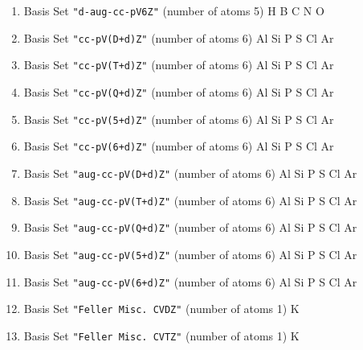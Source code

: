 \begin{enumerate}
\item Basis Set \verb#"d-aug-cc-pV6Z"# (number of atoms 5)  \newline
  H B C N O


\item Basis Set \verb#"cc-pV(D+d)Z"# (number of atoms 6)  \newline
  Al Si P S Cl Ar


\item Basis Set \verb#"cc-pV(T+d)Z"# (number of atoms 6)  \newline
  Al Si P S Cl Ar


\item Basis Set \verb#"cc-pV(Q+d)Z"# (number of atoms 6)  \newline
  Al Si P S Cl Ar

\item Basis Set \verb#"cc-pV(5+d)Z"# (number of atoms 6)  \newline
  Al Si P S Cl Ar


\item Basis Set \verb#"cc-pV(6+d)Z"# (number of atoms 6)  \newline
  Al Si P S Cl Ar


\item Basis Set \verb#"aug-cc-pV(D+d)Z"# (number of atoms 6)  \newline
  Al Si P S Cl Ar


\item Basis Set \verb#"aug-cc-pV(T+d)Z"# (number of atoms 6)  \newline
  Al Si P S Cl Ar


\item Basis Set \verb#"aug-cc-pV(Q+d)Z"# (number of atoms 6)  \newline
  Al Si P S Cl Ar


\item Basis Set \verb#"aug-cc-pV(5+d)Z"# (number of atoms 6)  \newline
  Al Si P S Cl Ar


\item Basis Set \verb#"aug-cc-pV(6+d)Z"# (number of atoms 6)  \newline
  Al Si P S Cl Ar


\item Basis Set \verb#"Feller Misc. CVDZ"# (number of atoms 1)  \newline
  K


\item Basis Set \verb#"Feller Misc. CVTZ"# (number of atoms 1)  \newline
  K



\end{enumerate}
